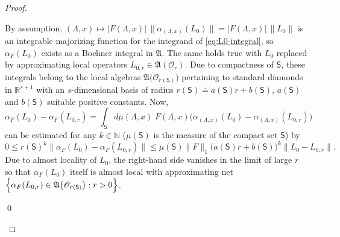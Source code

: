 \documentclass[a4paper,a4paper]{article}
\numberwithin{equation}{section}
\newcommand{\Nbb}{\mathbb{N}}
\newcommand{\Afrak}{\mathfrak{A}}
\newcommand{\Oscr}{\mathscr{O}}
\newcommand{\Ssf}{\mathsf{S}}
\newcommand{\Rsone}{\mathbb{R}^{s + 1}}
\newcommand{\aLax}{\alpha_{( \Lambda , x )}}
\newcommand{\AOr}{\mathfrak{A} ( \mathscr{O}_r )}
\newcounter{proofitem}
\newenvironment{prooflist}{\begin{list}{(\roman{proofitem})}%
  {\usecounter{proofitem} \setlength{\topsep}{0ex}%
   \setlength{\parsep}{0.2ex} \setlength{\itemsep}{0.4ex}%
   \setlength{\leftmargin}{0em} \setlength{\itemindent}{0.5em}%
   \setlength{\listparindent}{1em}}}{\qed \end{list}}
\theoremstyle{definition}
\theoremstyle{plain}
\theoremstyle{remark}
\newcommand{\Bset}[1]{\Bigl\{ #1 \Bigr\}}
\newcommand{\abs}[1]{\lvert #1 \rvert}
\newcommand{\norm}[1]{\lVert #1 \rVert}
\newcommand{\bnorm}[1]{\bigl\lVert #1 \bigr\rVert}
\begin{document}
  \begin{proof}
    \begin{prooflist}
    \item By assumption, $( \Lambda , x ) \mapsto \abs{F ( \Lambda , x
      )} \, \norm{\aLax ( L_0 )} = \abs{F ( \Lambda , x )} \,
      \norm{L_0}$ is an integrable majorizing function for the
      integrand of \eqref{eq:L0-integral}, so $\alpha_F ( L_0 )$
      exists as a Bochner integral in $\Afrak$. The same holds true
      with $L_0$ replaced by approximating local operators $L_{0 , r}
      \in \AOr$. Due to compactness of $\Ssf$, these integrals belong
      to the local algebras $\Afrak \bigl( \Oscr_{r ( \Ssf )} \bigr)$
      pertaining to standard diamonds in $\Rsone$ with an
      $s$-dimensional basis of radius $r ( \Ssf ) \doteq a ( \Ssf ) r
      + b ( \Ssf )$, $a ( \Ssf )$ and $b ( \Ssf )$ suitable
      positive constants. Now,
      \begin{equation*}
        \alpha_F ( L_0 ) - \alpha_F ( L_{0,r} ) = \int_\Ssf d \mu (
        \Lambda , x ) \; F ( \Lambda , x ) \bigl( \aLax ( L_0 ) -
        \aLax ( L_{0,r} ) \bigr)
      \end{equation*}
      can be estimated for any $k \in \Nbb$ ($\mu ( \Ssf )$ is the
      measure of the compact set $\Ssf$) by
      \begin{equation*}
        0 \leqslant r ( \Ssf )^k \bnorm{\alpha_F ( L_0 ) - \alpha_F (
        L_{0,r} )} \leqslant \mu ( \Ssf ) \norm{F}_1 \bigl( a ( \Ssf )
        r + b ( \Ssf ) \bigr)^k \norm{L_0 - L_{0,r}} \text{.}
      \end{equation*}
      Due to almost locality of $L_0$, the right-hand side vanishes in
      the limit of large $r$ so that $\alpha_F ( L_0 )$ itself is
      almost local with approximating net $\Bset{\alpha_F ( L_{0,r} )
      \in \Afrak \bigl( \Oscr_{r ( \Ssf )} \bigr) : r > 0}$.
      

\end{prooflist}
\end{proof}
\end{document}
